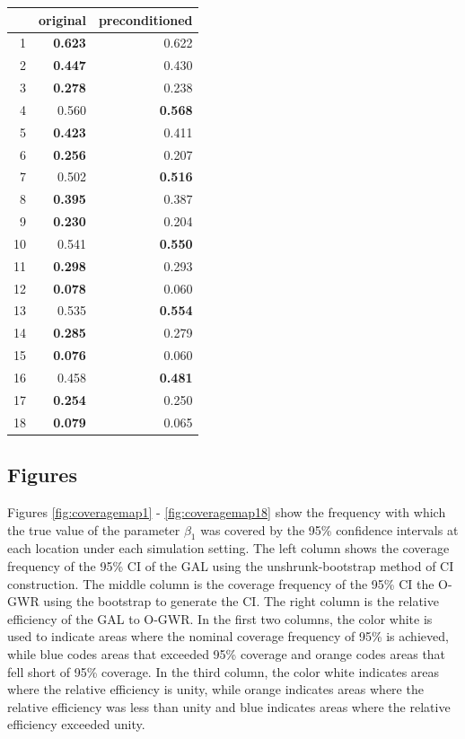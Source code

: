 \documentclass[authoryear, review, 11pt]{elsarticle}
\begin{document}
\begin{table}[ht]
\centering
\begin{tabular}{rrr}
  \hline
 & original & preconditioned \\ 
  \hline
1 & \textbf{0.623} & 0.622 \\ 
  2 & \textbf{0.447} & 0.430 \\ 
  3 & \textbf{0.278} & 0.238 \\ 
  4 & 0.560 & \textbf{0.568} \\ 
  5 & \textbf{0.423} & 0.411 \\ 
  6 & \textbf{0.256} & 0.207 \\ 
  7 & 0.502 & \textbf{0.516} \\ 
  8 & \textbf{0.395} & 0.387 \\ 
  9 & \textbf{0.230} & 0.204 \\ 
  10 & 0.541 & \textbf{0.550} \\ 
  11 & \textbf{0.298} & 0.293 \\ 
  12 & \textbf{0.078} & 0.060 \\ 
  13 & 0.535 & \textbf{0.554} \\ 
  14 & \textbf{0.285} & 0.279 \\ 
  15 & \textbf{0.076} & 0.060 \\ 
  16 & 0.458 & \textbf{0.481} \\ 
  17 & \textbf{0.254} & 0.250 \\ 
  18 & \textbf{0.079} & 0.065 \\ 
   \hline
\end{tabular}
\end{table}

	
	\subsection{Figures}
	Figures \ref{fig:coveragemap1} - \ref{fig:coveragemap18} show the frequency with which the true value of the parameter $\beta_1$ was covered by the 95\% confidence intervals at each location under each simulation setting. The left column shows the coverage frequency of the 95\% CI of the GAL using the unshrunk-bootstrap method of CI construction. The middle column is the coverage frequency of the 95\% CI the O-GWR using the bootstrap to generate the CI. The right column is the relative efficiency of the GAL to O-GWR. In the first two columns, the color white is used to indicate areas where the nominal coverage frequency of 95\% is achieved, while blue codes areas that exceeded 95\% coverage and orange codes areas that fell short of 95\% coverage. In the third column, the color white indicates areas where the relative efficiency is unity, while orange indicates areas where the relative efficiency was less than unity and blue indicates areas where the relative efficiency exceeded unity.\\	
	
\end{document}
